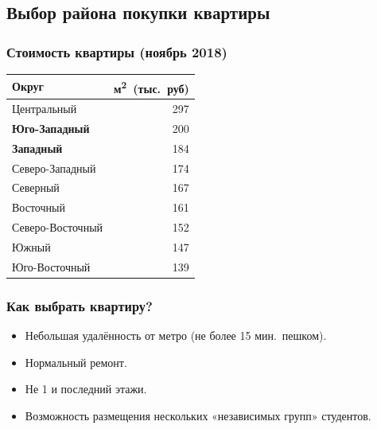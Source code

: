 \documentclass{beamer}
\begin{document}
	
	\subsection{Выбор района покупки квартиры}
	
		
		\begin{frame}
			\frametitle{Стоимость квартиры (ноябрь 2018)}
		
			
				\centering
				\begin{tabular}{ l r }
					\toprule
					Округ                 & м\textsuperscript{2}\ (тыс.\ руб) \\
					\midrule
					Центральный           & 297                               \\
					\textbf{Юго-Западный} & 200                               \\
					\textbf{Западный}     & 184                               \\
					Северо-Западный       & 174                               \\
					Северный              & 167                               \\
					Восточный             & 161                               \\
					Северо-Восточный      & 152                               \\
					Южный                 & 147                               \\
					Юго-Восточный         & 139                               \\
					\bottomrule
				\end{tabular}
			

		
		\end{frame}
		
		\begin{frame}
			\frametitle{Как выбрать квартиру?}
		
			\begin{itemize}
			\item Небольшая удалённость от метро (не более 15 мин.\ пешком).
			\item Нормальный ремонт.
			\item Не 1 и последний этажи.
			\item Возможность размещения нескольких «независимых групп» студентов.
			\end{itemize}
			
			
		\end{frame}
		
\end{document}
